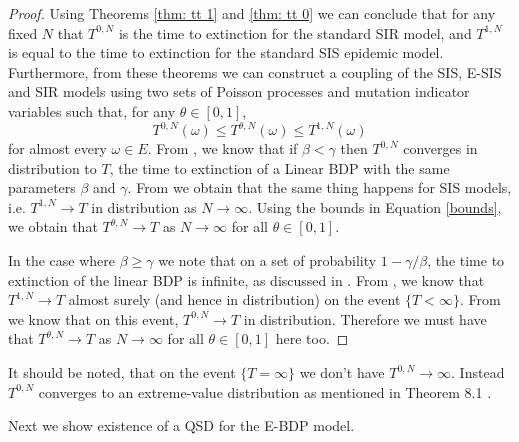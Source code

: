 \documentclass[review]{elsarticle}
\begin{document}
\begin{proof}
	Using Theorems \ref{thm: tt 1} and \ref{thm: tt 0} we can conclude that for any fixed $N$ that $T^{0,N}$ is the time to extinction for the standard SIR model, and $T^{1,N}$ is equal to the time to extinction for the standard SIS epidemic model. Furthermore, from these theorems we can construct a coupling of the SIS, E-SIS and SIR models using two sets of Poisson processes and mutation indicator variables such that, for any $\theta \in [0,1]$,
\begin{equation}\label{bounds}
		T^{0,N}(\omega) \leq T^{\theta,N}(\omega) \leq T^{1,N}(\omega)
\end{equation}
for almost every $\omega\in E$. From \cite{barbour1975}, we know that if $\beta < \gamma$ then $T^{0,N}$ converges in distribution to $T$, the time to extinction of a Linear BDP with the same parameters $\beta$ and $\gamma$. From \cite{andersson1998} we obtain that the same thing happens for SIS models, i.e. $T^{1,N} \rightarrow T$ in distribution as $N \rightarrow \infty$. Using the bounds in Equation \eqref{bounds}, we obtain that $T^{\theta,N} \rightarrow T$ as $N \rightarrow \infty$ for all $\theta\in[0,1]$. 
	
	In the case where $\beta \geq \gamma$ we note that on a set of probability $1 - \gamma/\beta$, the time to extinction of the linear BDP is infinite, as discussed in \cite{Anderson1991}. From \cite{andersson1998}, we know that $T^{1,N} \rightarrow T$ almost surely (and hence in distribution) on the event $\{T < \infty \}$. From \cite{barbour1975} we know that on this event, $T^{0,N} \rightarrow T$ in distribution. Therefore we must have that $T^{\theta,N} \rightarrow T$ as $N \rightarrow \infty$ for all $\theta\in[0,1]$ here too. 
\end{proof}
It should be noted, that on the event $\{T = \infty\}$ we don't have $T^{0,N} \rightarrow \infty$. Instead $T^{0,N}$ converges to an extreme-value distribution as mentioned in Theorem 8.1 \cite{Andersson2000}.

Next we show existence of a QSD for the E-BDP model.
\end{document}
